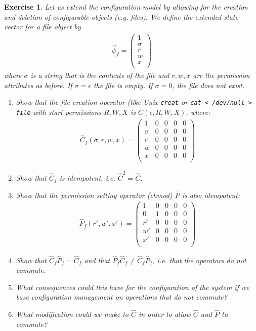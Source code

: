 \documentclass{book}
\newtheorem{exercise}{Exercise}
\def\beq{\begin{eqnarray}}
\def\eeq{\end{eqnarray}}
\begin{document}
\begin{exercise}
Let us extend the configuration model by allowing for the creation
and deletion of configurable objects (e.g. files). We define the
extended state vector for a file object by
\beq
\vec\psi_f = \left(
\begin{array}{c}
1\\
\sigma\\
r\\
w\\
x\\
\end{array}
\right)
\eeq
where $\sigma$ is a string that is the contents of the file and $r,w,x$
are the permission attributes as before. If $\sigma=\epsilon$ the file
is empty. If $\sigma=0$, the file does not exist.
\begin{enumerate}
\item Show that the file creation operator (like Unix {\tt creat}
or \verb+cat < /dev/null > file+
with start permissions $R,W,X$ is $\hat C(\epsilon,R,W,X)$, where:
\beq
\hat C_f(\sigma,r,w,x) = \left(
\begin{array}{ccccc}
1 & 0 & 0 & 0 & 0\\
\sigma & 0 & 0 & 0 & 0\\
r & 0 & 0 & 0 & 0\\
w & 0 & 0 & 0 & 0\\
x & 0 & 0 & 0 & 0\\
\end{array}
\right)
\eeq
\item Show that $\hat C_f$ is idempotent, i.e. $\hat C^2 = \hat C$.

\item Show that the permission setting operator (chmod) $\hat P$
is also idempotent:
\beq
\hat P_f(r',w',x') = \left(
\begin{array}{ccccc}
1 & 0 & 0 & 0 & 0\\
0 & 1 & 0 & 0 & 0\\
r' & 0 & 0 & 0 & 0\\
w' & 0 & 0 & 0 & 0\\
x' & 0 & 0 & 0 & 0\\
\end{array}
\right)
\eeq

\item Show that $\hat C_f\hat P_f = \hat C_f$ and that $\hat P_f\hat C_f \not = \hat C_f\hat P_f$, i.e. that the operators do not commute.

\item What consequences could this have for the configuration of the
system if we base configuration management on operations that do not commute?

\item What modification could we make to $\hat C$ in order to allow
$\hat C$ and $\hat P$ to commute?

\end{enumerate}
\end{exercise}
\begin{solution}
\end{solution}
\end{document}
